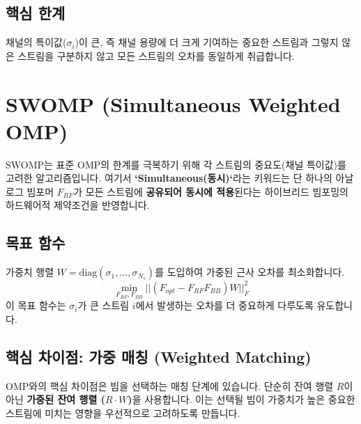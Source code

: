 \documentclass[10pt]{article}
\begin{document}
\subsection{핵심 한계}
채널의 특이값($\sigma_i$)이 큰, 즉 채널 용량에 더 크게 기여하는 중요한 스트림과 그렇지 않은 스트림을 구분하지 않고 모든 스트림의 오차를 동일하게 취급합니다.

\section{SWOMP (Simultaneous Weighted OMP)}
SWOMP는 표준 OMP의 한계를 극복하기 위해 각 스트림의 중요도(채널 특이값)를 고려한 알고리즘입니다. 여기서 \textbf{`Simultaneous(동시)`}라는 키워드는 단 하나의 아날로그 빔포머 $F_{RF}$가 모든 스트림에 \textbf{공유되어 동시에 적용}된다는 하이브리드 빔포밍의 하드웨어적 제약조건을 반영합니다.

\subsection{목표 함수}
가중치 행렬 $W = \text{diag}(\sigma_1, \dots, \sigma_{N_s})$를 도입하여 가중된 근사 오차를 최소화합니다.
\begin{equation}
    \min_{F_{RF}, F_{BB}} ||(F_{opt} - F_{RF}F_{BB})W||_F^2
\end{equation}
이 목표 함수는 $\sigma_i$가 큰 스트림 $i$에서 발생하는 오차를 더 중요하게 다루도록 유도합니다.

\subsection{핵심 차이점: 가중 매칭 (Weighted Matching)}
OMP와의 핵심 차이점은 빔을 선택하는 매칭 단계에 있습니다. 단순히 잔여 행렬 $R$이 아닌 \textbf{가중된 잔여 행렬 ($R \cdot W$)}을 사용합니다. 이는 선택될 빔이 가중치가 높은 중요한 스트림에 미치는 영향을 우선적으로 고려하도록 만듭니다.
\end{document}
